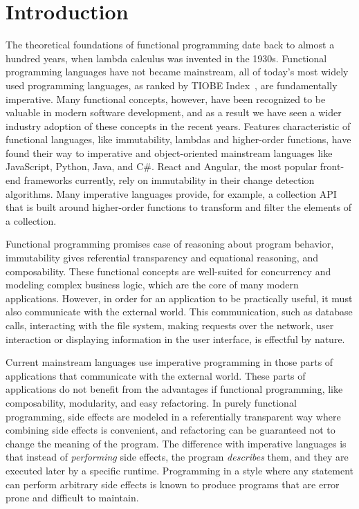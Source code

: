 \chapter{Introduction} \label{Introduction}
The theoretical foundations of functional programming date back to almost a hundred years, when lambda calculus was invented in the 1930s. Functional programming languages have not became mainstream, all of today's most widely used programming languages, as ranked by TIOBE Index~\cite{tiobe-index}, are fundamentally imperative. Many functional concepts, however, have been recognized to be valuable in modern software development, and as a result we have seen a wider industry adoption of these concepts in the recent years. Features characteristic of functional languages, like immutability, lambdas and higher-order functions, have found their way to imperative and object-oriented mainstream languages like JavaScript, Python, Java, and C\#. React and Angular, the most popular front-end frameworks currently, rely on immutability in their change detection algorithms. Many imperative languages provide, for example, a collection API that is built around higher-order functions to transform and filter the elements of a collection. 

Functional programming promises case of reasoning about program behavior, immutability gives referential transparency and equational reasoning, and composability. These functional concepts are well-suited for concurrency and modeling complex business logic, which are the core of many modern applications. However, in order for an application to be practically useful, it must also communicate with the external world. This communication, such as database calls, interacting with the file system, making requests over the network, user interaction or displaying information in the user interface, is effectful by nature.




Current mainstream languages use imperative programming in those parts of applications that communicate with the external world. These parts of applications do not benefit from the advantages if functional programming, like composability, modularity, and easy refactoring. In purely functional programming, side effects are modeled in a referentially transparent way where combining side effects is convenient, and refactoring can be guaranteed not to change the meaning of the program. The difference with imperative languages is that instead of \textit{performing} side effects, the program \textit{describes} them, and they are executed later by a specific runtime. Programming in a style where any statement can perform arbitrary side effects is known to produce programs that are error prone and difficult to maintain.~\cite[Chapter~3]{sicp}

